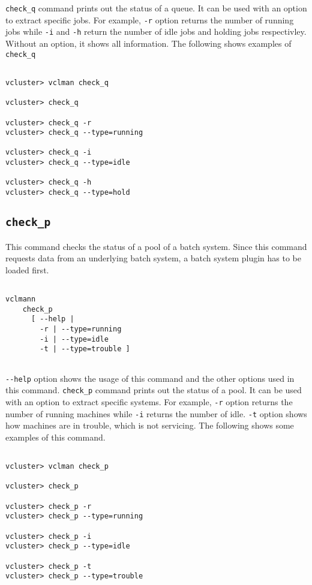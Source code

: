 \documentclass[11pt]{article}
\def \ttt{\texttt}
\def \vb{\verb}
\begin{document}
\vb+check_q+ command prints out the status of a queue. It can be used with an option to extract specific jobs. For example, \vb+-r+ option returns the number of running jobs while \vb+-i+ and \vb+-h+ return the number of idle jobs and holding jobs respectivley. Without an option, it shows all information. The following shows examples of \vb+check_q+


\begin{Verbatim}[fontfamily=courier, fontsize = \small, obeytabs
=true, tabsize=4, frame=lines]

vcluster> vclman check_q

vcluster> check_q

vcluster> check_q -r
vcluster> check_q --type=running

vcluster> check_q -i
vcluster> check_q --type=idle

vcluster> check_q -h
vcluster> check_q --type=hold

\end{Verbatim}



\subsection{\ttt{check\_p}}

This command checks the status of a pool of a batch system. Since this command requests data from an underlying batch system, a batch system plugin has to be loaded first.

\begin{Verbatim}[fontfamily=courier, fontsize = \small, obeytabs
=true, tabsize=4, frame=lines]

vclmann 
    check_p
      [ --help |
        -r | --type=running
        -i | --type=idle  
        -t | --type=trouble ] 
      
\end{Verbatim}

\vb+--help+ option shows the usage of this command and the other options used in this command. 
\vb+check_p+ command prints out the status of a pool. It can be used with an option to extract specific systems. For example, \vb+-r+ option returns the number of running machines while \vb+-i+ returns the number of idle. \vb+-t+ option shows how machines are in trouble, which is not servicing. The following shows some examples of this command.


\begin{Verbatim}[fontfamily=courier, fontsize = \small, obeytabs
=true, tabsize=4, frame=lines]

vcluster> vclman check_p

vcluster> check_p

vcluster> check_p -r
vcluster> check_p --type=running

vcluster> check_p -i
vcluster> check_p --type=idle

vcluster> check_p -t
vcluster> check_p --type=trouble

\end{Verbatim}
\end{document}
